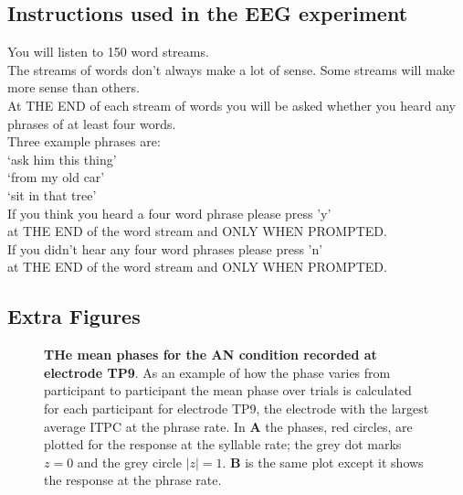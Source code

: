 \documentclass[10pt,letterpaper]{article}
\begin{document}
\subsection*{Instructions used in the EEG experiment}

You will listen to 150 word streams. \\[0.5cm]
The streams of words don't always make a lot of sense.
Some streams will make more sense than others.\\[0.5cm]
At THE END of each stream of words you will be asked whether
you heard any phrases of at least four words.\\[0.5cm]
Three example phrases are:\\[0.5cm]
`ask him this thing'  \\
`from my old car'\\
`sit in that tree'\\[0.5cm]
If you think you heard a four word phrase please press 'y'\\
at THE END of the word stream and ONLY WHEN PROMPTED.\\[0.5cm]
If you didn't hear any four word phrases please press 'n'\\
at THE END of the word stream and ONLY WHEN PROMPTED.\\

\newpage

\subsection*{Extra Figures}

 \begin{figure}[hp]

\caption{\textbf{THe mean phases for the AN condition recorded at
    electrode TP9}. As an example of how the phase varies from
  participant to participant the mean phase over trials is calculated
  for each participant for electrode TP9, the electrode with the
  largest average ITPC at the phrase rate. In \textbf{A} the phases,
  red circles, are plotted for the response at the syllable rate; the
  grey dot marks $z=0$ and the grey circle $|z|=1$. \textbf{B} is the
  same plot except it shows the response at the phrase
  rate. \label{fig:phases}}
\end{figure}
\end{document}
